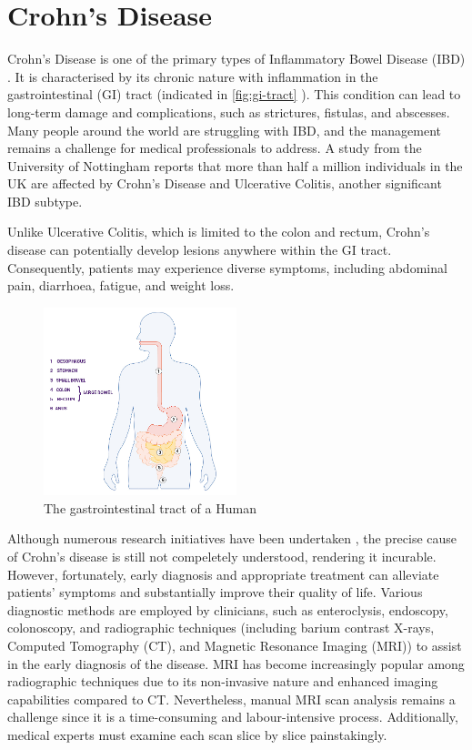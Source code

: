 \section{Crohn's Disease}
Crohn's Disease \cite{baumgart2012crohn,crohnsNHS} is one of the primary types of Inflammatory Bowel Disease (IBD) \cite{IBDCDC}. It is characterised by its chronic nature with inflammation in the gastrointestinal (GI) tract (indicated in \autoref{fig:gi-tract} \cite{digestio98:online}). This condition can lead to long-term damage and complications, such as strictures, fistulas, and abscesses. Many people around the world are struggling with IBD, and the management remains a challenge for medical professionals to address. A study from the University of Nottingham \cite{UoNResearch} reports that more than half a million individuals in the UK are affected by Crohn's Disease and Ulcerative Colitis, another significant IBD subtype. 

Unlike Ulcerative Colitis, which is limited to the colon and rectum, Crohn's disease can potentially develop lesions anywhere within the GI tract. Consequently, patients may experience diverse symptoms, including abdominal pain, diarrhoea, fatigue, and weight loss.
\begin{figure}[htp]
    \centering
    \includegraphics[width=0.5\textwidth]{figures/digestion-graphic.jpg}
    \caption{The gastrointestinal tract of a Human}
    \label{fig:gi-tract}
\end{figure}

Although numerous research initiatives have been undertaken \cite{hoarau2016bacteriome,feuerstein2021aga}, the precise cause of Crohn's disease is still not compeletely understood, rendering it incurable. However, fortunately, early diagnosis and appropriate treatment can alleviate patients' symptoms and substantially improve their quality of life. Various diagnostic methods are employed by clinicians, such as enteroclysis, endoscopy, colonoscopy, and radiographic techniques (including barium contrast X-rays, Computed Tomography (CT), and Magnetic Resonance Imaging (MRI)) to assist in the early diagnosis of the disease. MRI has become increasingly popular among radiographic techniques due to its non-invasive nature and enhanced imaging capabilities compared to CT. Nevertheless, manual MRI scan analysis remains a challenge since it is a time-consuming and labour-intensive process. Additionally, medical experts must examine each scan slice by slice painstakingly.

